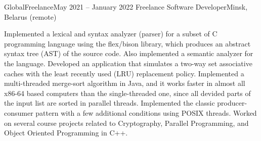 
\begin{cvHeadingList}

  \cvCustomHeading
    {GlobalFreelance}{May 2021 – January 2022}
    {Freelance Software Developer}{Minsk, Belarus (remote)} %

  \begin{cvList}
    \cvItem Implemented a lexical and syntax analyzer (parser) for a
      subset of C programming language using the flex/bison library,
      which produces an abstract syntax tree (AST) of the source code.
      Also implemented a semantic analyzer for the language.
    \cvItem Developed an application that simulates a two-way set
      associative caches with the least recently used (LRU) replacement
      policy.
    \cvItem Implemented a multi-threaded merge-sort algorithm in Java,
      and it works faster in almost all x86-64 based computers than
      the single-threaded one, since all devided parts of the input
      list are sorted in parallel threads.
    \cvItem Implemented the classic producer-consumer pattern with a
      few additional conditions using POSIX threads.
    \cvItem Worked on several course projects related to Cryptography,
      Parallel Programming, and Object Oriented Programming in C++.
  \end{cvList}

\end{cvHeadingList}
